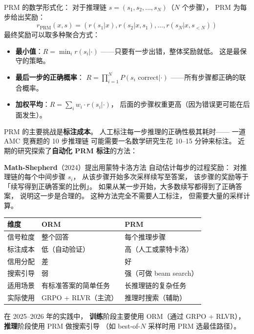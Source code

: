 PRM 的数学形式化：
对于推理链 $s = (s_1, s_2, \ldots, s_N)$（$N$ 个步骤），
PRM 为每步给出奖励：
\begin{equation}
  r_{\text{PRM}}(x, s) = \left(r(s_1|x), r(s_2|x, s_1), \ldots,
  r(s_N|x, s_{<N})\right)
\end{equation}
最终奖励可以取多种聚合方式：
\begin{itemize}[noitemsep]
  \item \textbf{最小值}：$R = \min_i r(s_i | \cdot)$
       ——只要有一步出错，整体奖励就低。
        这是最保守的策略。
  \item \textbf{最后一步的正确概率}：
        $R = \prod_{i=1}^N P(s_i \text{ correct} | \cdot)$
       ——所有步骤都正确的联合概率。
  \item \textbf{加权平均}：$R = \sum_i w_i \cdot r(s_i | \cdot)$，
        后面的步骤权重更高（因为错误更可能在后面发生）。
\end{itemize}

PRM 的主要挑战是\textbf{标注成本}。
人工标注每一步推理的正确性极其耗时——
一道 AMC 竞赛题的 10 步推理链
可能需要一名数学研究生花 10--15 分钟来标注。
近期的研究探索了\textbf{自动化 PRM 标注}的方法：

\textbf{Math-Shepherd}（2024）提出用蒙特卡洛方法
自动估计每步的过程奖励：
对推理链的每个中间步骤 $s_i$，
从该步骤开始多次采样续写至答案，
该步骤的奖励等于「续写得到正确答案的比例」。
如果从某一步开始，大多数续写都得到了正确答案，
说明这一步是合理的。
这种方法完全不需要人工标注，
但需要大量的采样计算。


\begin{corebox}
\begin{tabularx}{\linewidth}{l X X}
\toprule
\textbf{维度} & \textbf{ORM} & \textbf{PRM} \\
\midrule
信号粒度 & 整个回答 & 每个推理步骤 \\
标注成本 & 低（自动验证） & 高（人工或蒙特卡洛） \\
信用分配 & 差 & 好 \\
搜索引导 & 弱 & 强（可做 beam search） \\
适用场景 & 有标准答案的简单任务 & 长推理链的复杂任务 \\
实际使用 & GRPO + RLVR（主流） & 推理时搜索（辅助） \\
\bottomrule
\end{tabularx}
在 2025--2026 年的实践中，
\textbf{训练}阶段主要使用 ORM（通过 GRPO + RLVR），
\textbf{推理}阶段使用 PRM 做搜索引导
（如 best-of-$N$ 采样时用 PRM 选最佳路径）。
\end{corebox}

